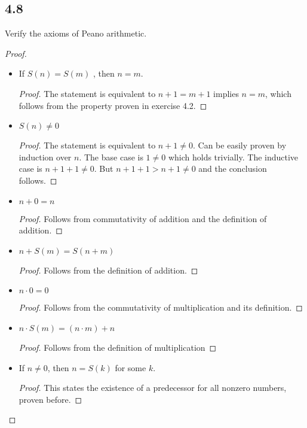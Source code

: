 \subsection*{4.8} Verify the axioms of Peano arithmetic.

\begin{proof}
\begin{itemize}
    \item If $S(n) = S(m)$ , then $n = m$.
    
    \begin{proof}
    The statement is equivalent to $n+1=m+1$ implies $n = m$, which follows from the property proven in exercise 4.2.
    \end{proof}
    
    \item $S(n) \neq 0$
    
    \begin{proof}
    The statement is equivalent to $n+1 \neq 0$. Can be easily proven by induction over $n$. The base case is $1 \neq 0$ which holds trivially. The inductive case is $n + 1 + 1 \neq 0$. But $n+1+1 > n+1 \neq 0$ and the conclusion follows.
    \end{proof}
    
    \item $n+0 = n$
    
    \begin{proof}
    Follows from commutativity of addition and the definition of addition.
    \end{proof}
    
    \item $n+S(m) = S(n+m)$
    
    \begin{proof}
    Follows from the definition of addition.
    \end{proof}
    
    \item $n \cdot 0 = 0$
    
    \begin{proof}
    Follows from the commutativity of multiplication and its definition.
    \end{proof}
    
    \item  $n \cdot S(m) = (n \cdot m) + n$
    
    \begin{proof}
    Follows from the definition of multiplication
    \end{proof}
    
    \item If $n \neq 0$, then $n = S(k)$ for some $k$.
    
    \begin{proof}
    This states the existence of a predecessor for all nonzero numbers, proven before.
    \end{proof}
    
\end{itemize}
\end{proof}

\newpage
